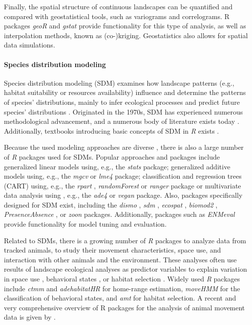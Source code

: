 \documentclass[smallextended]{svjour3}       %
\begin{document}
Finally, the spatial structure of continuous landscapes can be quantified and compared with geostatistical tools, such as variograms and correlograms.
R packages \emph{geoR} \cite{R-geoR} and \emph{gstat} \cite{R-gstat} provide functionality for this type of analysis, as well as interpolation methods, known as (co-)kriging.
Geostatistics also allows for spatial data simulations.

\hypertarget{sec:SDM}{%
\paragraph{Species distribution modeling}\label{sec:SDM}}

Species distribution modeling (SDM) examines how landscape patterns (e.g., habitat suitability or resources availability) influence and determine the patterns of species' distributions, mainly to infer ecological processes and predict future species' distributions \cite{Wiersma2011}.
Originated in the 1970s, SDM has experienced numerous methodological advancement, and a numerous body of literature exists today \cite{Zimmermann2010,Norberg2019}.
Additionally, textbooks introducing basic concepts of SDM in \emph{R} exists \cite{Guisan2017,Fletcher2019}.

Because the used modeling approaches are diverse \cite{Hooten2011,Kerr2011,Fletcher2019}, there is also a large number of \emph{R} packages used for SDMs.
Popular approaches and packages include generalized linear models using, e.g., the \emph{stats} \cite{RCoreTeam2019} package; generalized additive models using, e.g., the \emph{mgcv} \cite{Wood2017} or \emph{lme4} \cite{Bates2015} package; classification and regression trees (CART) using, e.g., the \emph{rpart} \cite{Therneau2019}, \emph{randomForest} \cite{Liaw2002} or \emph{ranger} \cite{Wright2017} package or multivariate data analysis using , e.g., the \emph{ade4} \cite{Dray2007} or \emph{vegan} \cite{Oksanen2019} package.
Also, packages specifically designed for SDM exist, including the \emph{dismo} \cite{Hijmans2017}, \emph{sdm} \cite{Naimi2016}, \emph{ecospat} \cite{Broennimann2020}, \emph{biomod2} \cite{Thuiller2020}, \emph{PresenceAbsence} \cite{Freeman2008}, or \emph{zoon} \cite{Golding2018} packages.
Additionally, packages such as \emph{ENMeval} \cite{R-enmeval} provide functionality for model tuning and evaluation.

Related to SDMs, there is a growing number of \emph{R} packages to analyze data from tracked animals, to study their movement characteristics, space use, and interaction with other animals and the environment.
These analyses often use results of landscape ecological analyses as predictor variables to explain variation in space use \cite{signer2015}, behavioral states \cite{langrock2012}, or habitat selection \cite{fieberg2020}.
Widely used \emph{R} packages include \emph{ctmm} \cite{calabrese2016} and \emph{adehabitatHR} \cite{Calenge2006} for home-range estimation, \emph{moveHMM} \cite{michelot2016} for the classification of behavioral states, and \emph{amt} \cite{Signer2019} for habitat selection.
A recent and very comprehensive overview of R packages for the analysis of animal movement data is given by \cite{joo2020}.
\end{document}
